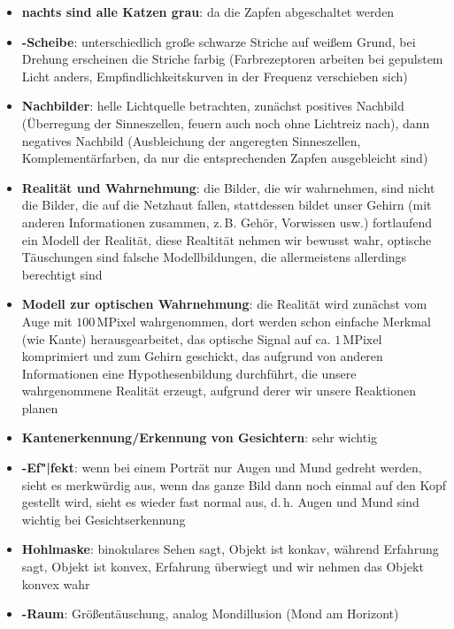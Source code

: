 \linie
\begin{itemize}
    \item
    \textbf{nachts sind alle Katzen grau}:
    da die Zapfen abgeschaltet werden
    
    \item
    \textbf{-Scheibe}:
    unterschiedlich große schwarze Striche auf weißem Grund, bei Drehung
    erscheinen die Striche farbig (Farbrezeptoren arbeiten bei gepulstem Licht
    anders, Empfindlichkeitskurven in der Frequenz verschieben sich)
    
    \item
    \textbf{Nachbilder}:
    helle Lichtquelle betrachten,
    zunächst positives Nachbild (Überregung der Sinneszellen, feuern auch noch
    ohne Lichtreiz nach), dann negatives Nachbild
    (Ausbleichung der angeregten Sinneszellen, Komplementärfarben, da nur
    die entsprechenden Zapfen ausgebleicht sind)
\end{itemize}
\linie
\begin{itemize}
    \item
    \textbf{Realität und Wahrnehmung}:
    die Bilder, die wir wahrnehmen, sind nicht die Bilder, die auf die
    Netzhaut fallen, stattdessen bildet unser Gehirn (mit anderen Informationen
    zusammen, z.\,B. Gehör, Vorwissen usw.) fortlaufend ein Modell der
    Realität, diese Realtität nehmen wir bewusst wahr,
    optische Täuschungen sind falsche Modellbildungen,
    die allermeistens allerdings berechtigt sind
    
    \item
    \textbf{Modell zur optischen Wahrnehmung}:
    die Realität wird zunächst vom Auge mit $100\,\text{MPixel}$ wahrgenommen,
    dort werden schon einfache Merkmal (wie Kante) herausgearbeitet,
    das optische Signal auf ca. $1\,\text{MPixel}$ komprimiert und zum
    Gehirn geschickt, das aufgrund von anderen Informationen eine
    Hypothesenbildung durchführt, die unsere wahrgenommene Realität
    erzeugt, aufgrund derer wir unsere Reaktionen planen
    
    \item
    \textbf{Kantenerkennung/Erkennung von Gesichtern}:
    sehr wichtig
    
    \item
    \textbf{-Ef"|fekt}:
    wenn bei einem Porträt nur Augen und Mund gedreht werden,
    sieht es merkwürdig aus, wenn das ganze Bild dann noch einmal
    auf den Kopf gestellt wird, sieht es wieder fast normal aus,
    d.\,h. Augen und Mund sind wichtig bei Gesichtserkennung
    
    \item
    \textbf{Hohlmaske}:
    binokulares Sehen sagt, Objekt ist konkav,
    während Erfahrung sagt, Objekt ist konvex,
    Erfahrung überwiegt und wir nehmen das Objekt konvex wahr
    
    \item
    \textbf{-Raum}:
    Größentäuschung, analog Mondillusion (Mond am Horizont)
\end{itemize}
